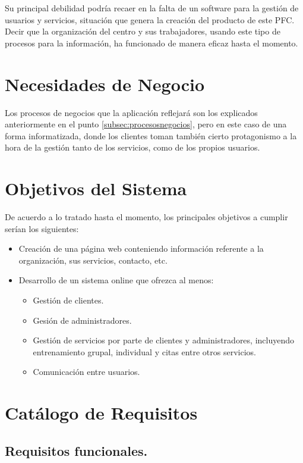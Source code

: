 Su principal debilidad podría recaer en la falta de un software para la gestión de usuarios y servicios, situación que genera la creación del producto de este PFC. Decir que la organización del centro y sus trabajadores, usando este tipo de procesos para la información, ha funcionado de manera eficaz hasta el momento.


\section{Necesidades de Negocio}

Los procesos de negocios que la aplicación reflejará son los explicados anteriormente en el punto \ref{subsec:procesosnegocios}, pero en este caso de una forma informatizada, donde los clientes toman también cierto protagonismo a la hora de la gestión tanto de los servicios, como de los propios usuarios.


\section{Objetivos del Sistema}

De acuerdo a lo tratado hasta el momento, los principales objetivos a cumplir serían los siguientes: 

\begin{itemize}
\item Creación de una página web conteniendo información referente a la organización, sus servicios, contacto, etc. 
\item Desarrollo de un sistema online que ofrezca al menos: 
\begin{itemize}
\item Gestión de clientes.
\item Gesión de administradores.
\item Gestión de servicios por parte de clientes y administradores, incluyendo entrenamiento grupal, individual y citas entre otros servicios.
\item Comunicación entre usuarios.
\end {itemize}
\end{itemize}


\section{Catálogo de Requisitos}

\subsection{Requisitos funcionales.}\label{subsec:requisitosfuncionales}

